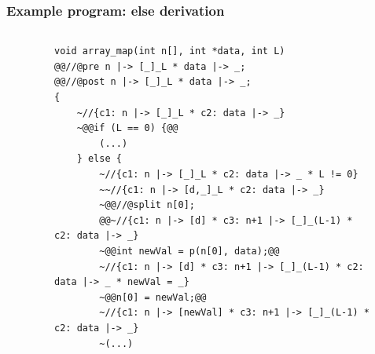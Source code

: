 \documentclass{beamer}
\begin{document}

\begin{frame}[fragile]
\frametitle{Example program: else derivation}
\vspace{-2em}
\begin{columns}
\begin{column}{0.03\textwidth}
\end{column}
\begin{column}{0.97\textwidth}
\begin{figure}[h]
  \centering
\begin{lstlisting}[style=CStyleOverlay, captionpos = t]
void array_map(int n[], int *data, int L)
@@//@pre n |-> [_]_L * data |-> _;
@@//@post n |-> [_]_L * data |-> _;
{
	~//{c1: n |-> [_]_L * c2: data |-> _}
	~@@if (L == 0) {@@
		(...)
	} else {
		~//{c1: n |-> [_]_L * c2: data |-> _ * L != 0}
		~~//{c1: n |-> [d,_]_L * c2: data |-> _}
		~@@//@split n[0];
		@@~//{c1: n |-> [d] * c3: n+1 |-> [_]_(L-1) * c2: data |-> _}
		~@@int newVal = p(n[0], data);@@
		~//{c1: n |-> [d] * c3: n+1 |-> [_]_(L-1) * c2: data |-> _ * newVal = _}
		~@@n[0] = newVal;@@
		~//{c1: n |-> [newVal] * c3: n+1 |-> [_]_(L-1) * c2: data |-> _}
		~(...)		
\end{lstlisting}
\end{figure}
\end{column}
\end{columns}
\end{frame}
\end{document}
